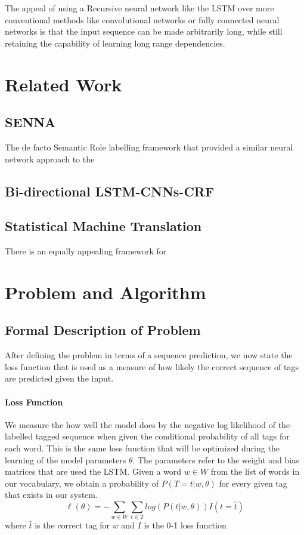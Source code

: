 \documentclass[fyp]{socreport}
\begin{document}
The appeal of using a Recursive neural network like the LSTM over more
conventional methods like convolutional networks or fully connected neural
networks is that the input sequence can be made arbitrarily long, while still
retaining the capability of learning long range dependencies.


\chapter{Related Work}
\section{SENNA}
The de facto Semantic Role labelling framework that provided a similar
neural network approach to the \cite{DBLP2011Collobert}

\section{Bi-directional LSTM-CNNs-CRF}


\section{Statistical Machine Translation}
There is an equally appealing framework for


\label{ch:related}


\chapter{Problem and Algorithm}
\section{Formal Description of Problem}
After defining the problem in terms of a sequence prediction, we now state the
loss function that is used as a measure of how likely the correct sequence of
tags are predicted given the input.

\subsubsection{Loss Function} We measure the how well the model does by the
negative log likelihood of the labelled tagged sequence when given the
conditional probability of all tags for each word. This is the same loss
function that will be optimized during the learning of the model parameters
$\theta$. The parameters refer to the weight and bias matrices that are used
the LSTM. Given a word $w \in W$ from the list of words in our vocabulary, we
obtain a probability of $P(T=t | w, \theta)$ for every given tag that exists in
our system.
\begin{equation}
  \ell(\theta) = -\sum_{w \in W} \sum_{t \in T} log(P(t | w, \theta)) I(t = \hat{t})
\end{equation}
where $\hat{t}$ is the correct tag for $w$ and $I$ is the 0-1 loss function
\end{document}
